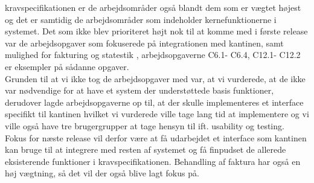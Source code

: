  kravspecifikationen er de arbejdsområder også blandt dem som er vægtet højest og det er samtidig de arbejdsområder som indeholder kernefunktionerne i systemet. Det som ikke blev prioriteret højt nok til at komme med i første release var de arbejdsopgaver som fokuserede på integrationen med kantinen, samt mulighed for fakturing og statestik , arbejdsopgaverne C6.1- C6.4, C12.1- C12.2 er eksempler på sådanne opgaver.
\\Grunden til at vi ikke tog de arbejdsopgaver med var, at vi vurderede, at de ikke var nødvendige for at have et system der understøttede basis funktioner, derudover lagde arbejdsopgaverne op til, at der skulle implementeres et interface specifikt til kantinen hvilket vi vurderede ville tage lang tid at implementere og vi ville også have tre brugergrupper at tage hensyn til ift. usability og testing.
\\Fokus for næste release vil derfor være at få udarbejdet et interface som kantinen kan bruge til at integrere med resten af systemet og få finpudset de allerede eksisterende funktioner i kravspecifikationen. Behandling af faktura har også en høj vægtning, så det vil der også blive lagt fokus på. 
